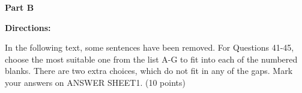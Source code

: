 \textbf{Part B}

\textbf{Directions:}

In the following text, some sentences have been removed. For Questions 41-45, choose the most suitable one from the list A-G to fit into each of the numbered blanks. There are two extra choices, which do not fit in any of the gaps. Mark your answers on ANSWER SHEET1. (10 points)

\vspace{6pt}
